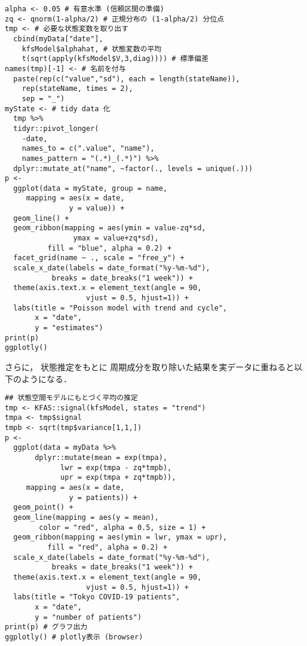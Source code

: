 \documentclass[10pt,oneside,fleqn]{scrartcl}
\begin{document}
\begin{verbatim}
alpha <- 0.05 # 有意水準 (信頼区間の準備)
zq <- qnorm(1-alpha/2) # 正規分布の (1-alpha/2) 分位点
tmp <- # 必要な状態変数を取り出す
  cbind(myData["date"],
	kfsModel$alphahat, # 状態変数の平均
	t(sqrt(apply(kfsModel$V,3,diag)))) # 標準偏差
names(tmp)[-1] <- # 名前を付与
  paste(rep(c("value","sd"), each = length(stateName)),
	rep(stateName, times = 2),
	sep = "_")
myState <- # tidy data 化
  tmp %>% 
  tidyr::pivot_longer(
    -date,
    names_to = c(".value", "name"), 
    names_pattern = "(.*)_(.*)") %>%
  dplyr::mutate_at("name", ~factor(., levels = unique(.)))
p <- 
  ggplot(data = myState, group = name,
	 mapping = aes(x = date,
		       y = value)) +
  geom_line() +
  geom_ribbon(mapping = aes(ymin = value-zq*sd,
			    ymax = value+zq*sd),
	      fill = "blue", alpha = 0.2) +
  facet_grid(name ~ ., scale = "free_y") + 
  scale_x_date(labels = date_format("%y-%m-%d"), 
	       breaks = date_breaks("1 week")) + 
  theme(axis.text.x = element_text(angle = 90,
				   vjust = 0.5, hjust=1)) +
  labs(title = "Poisson model with trend and cycle",
       x = "date",
       y = "estimates")
print(p)
ggplotly()
\end{verbatim}

さらに，
状態推定をもとに
周期成分を取り除いた結果を実データに重ねると以下のようになる．

\begin{figure}[htbp]
  \centering
  \myGraph[1]{}
\end{figure}

\begin{verbatim}
## 状態空間モデルにもとづく平均の推定
tmp <- KFAS::signal(kfsModel, states = "trend")
tmpa <- tmp$signal
tmpb <- sqrt(tmp$variance[1,1,])
p <-
  ggplot(data = myData %>%
	   dplyr::mutate(mean = exp(tmpa),
			 lwr = exp(tmpa - zq*tmpb),
			 upr = exp(tmpa + zq*tmpb)),
	 mapping = aes(x = date,
		       y = patients)) +
  geom_point() +
  geom_line(mapping = aes(y = mean),
	    color = "red", alpha = 0.5, size = 1) +
  geom_ribbon(mapping = aes(ymin = lwr, ymax = upr),
	      fill = "red", alpha = 0.2) +
  scale_x_date(labels = date_format("%y-%m-%d"), 
	       breaks = date_breaks("1 week")) + 
  theme(axis.text.x = element_text(angle = 90, 
				   vjust = 0.5, hjust=1)) +
  labs(title = "Tokyo COVID-19 patients",
       x = "date",
       y = "number of patients")
print(p) # グラフ出力
ggplotly() # plotly表示 (browser)
\end{verbatim}
\end{document}
